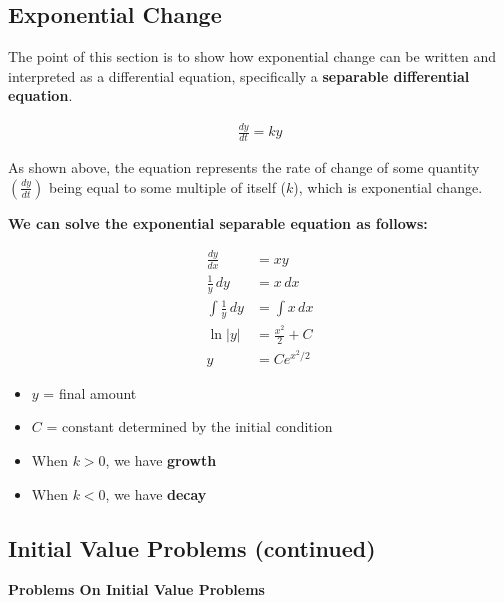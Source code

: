 \documentclass[11pt]{article}
\begin{document}
\subsection{Exponential Change}

The point of this section is to show how exponential change can be written and interpreted as
a differential equation, specifically a \textbf{separable differential equation}.

\begin{align}
  \frac{dy}{dt} = ky
\end{align}

As shown above, the equation represents the rate of change of some quantity $\left(\frac{dy}{dt}\right)$
being equal to some multiple of itself ($k$), which is exponential change.

\newpage
\textbf{We can solve the exponential separable equation as follows:}

\begin{align*}
\frac{dy}{dx} &= xy \\
\frac{1}{y}\,dy &= x\,dx \\
\int \frac{1}{y}\,dy &= \int x\,dx \\
\ln|y| &= \frac{x^2}{2} + C \\
y &= Ce^{x^2/2}
\end{align*}

\begin{itemize}
  \item $y$ = final amount
  \item $C$ = constant determined by the initial condition
  \item When $k > 0$, we have \textbf{growth}
  \item When $k < 0$, we have \textbf{decay}
\end{itemize}

\subsection{Initial Value Problems (continued)}
\textbf{Problems On Initial Value Problems}
\end{document}
